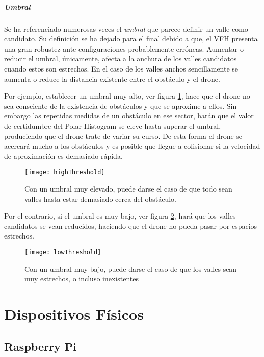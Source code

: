 \subparagraph{Umbral}
Se ha referenciado numerosas veces el \textit{umbral} que parece definir un valle como candidato. Su definición se ha dejado para el final debido a que, el VFH presenta una gran robustez ante configuraciones probablemente erróneas. Aumentar o reducir el umbral, únicamente, afecta a la anchura de los valles candidatos cuando estos son estrechos. En el caso de los valles anchos sencillamente se aumenta o reduce la distancia existente entre el obstáculo y el drone.

Por ejemplo, establecer un umbral muy alto, ver figura \ref{fig:highThreshold}, hace que el drone no sea consciente de la existencia de obstáculos y que se aproxime a ellos. Sin embargo las repetidas medidas de un obstáculo en ese sector, harán que el valor de certidumbre del Polar Histogram se eleve hasta superar el umbral, produciendo que el drone trate de variar su curso. De esta forma el drone se acercará mucho a los obstáculos y es posible que llegue a colisionar si la velocidad de aproximación es demasiado rápida. 
 \begin{figure}[H]
	\centering
	\texttt{[image: highThreshold]}
	\caption[Umbral elevado.]{Con un umbral muy elevado, puede darse el caso de que todo sean valles hasta estar demasiado cerca del obstáculo.}\label{fig:highThreshold}
\end{figure}

Por el contrario, si el umbral es muy bajo, ver figura \ref{fig:lowThreshold}, hará que los valles candidatos se vean reducidos, haciendo que el drone no pueda pasar por espacios estrechos.
 \begin{figure}[H]
	\centering
	\texttt{[image: lowThreshold]}
	\caption[Umbral bajo.]{Con un umbral muy bajo, puede darse el caso de que los valles sean muy estrechos, o incluso inexistentes}\label{fig:lowThreshold}
\end{figure}



\section{Dispositivos Físicos}

\subsection{Raspberry Pi}

